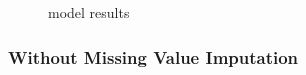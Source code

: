 \documentclass[
]{article}
\begin{document}
\begin{figure}[H]

{\centering {}

}

\caption{model results}\label{fig:ts}
\end{figure}

\subsubsection{Without Missing Value Imputation}\label{without-missing-value-imputation}
\end{document}
